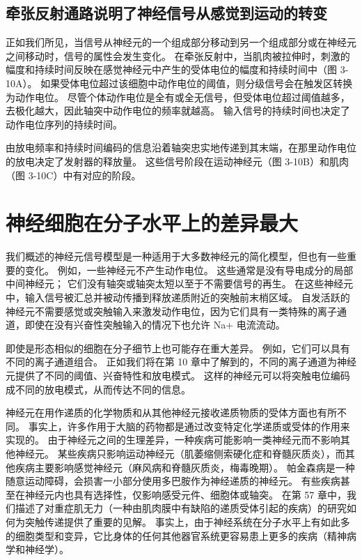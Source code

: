 \subsection{牵张反射通路说明了神经信号从感觉到运动的转变}
正如我们所见，当信号从神经元的一个组成部分移动到另一个组成部分或在神经元之间移动时，信号的属性会发生变化。 在牵张反射中，当肌肉被拉伸时，刺激的幅度和持续时间反映在感觉神经元中产生的受体电位的幅度和持续时间中（图 3-10A）。 如果受体电位超过该细胞中动作电位的阈值，则分级信号会在触发区转换为动作电位。 尽管个体动作电位是全有或全无信号，但受体电位超过阈值越多，去极化越大，因此轴突中动作电位的频率就越高。 输入信号的持续时间也决定了动作电位序列的持续时间。

由放电频率和持续时间编码的信息沿着轴突忠实地传递到其末端，在那里动作电位的放电决定了发射器的释放量。 这些信号阶段在运动神经元（图 3-10B）和肌肉（图 3-10C）中有对应的阶段。


\section{神经细胞在分子水平上的差异最大}
我们概述的神经元信号模型是一种适用于大多数神经元的简化模型，但也有一些重要的变化。 例如，一些神经元不产生动作电位。 这些通常是没有导电成分的局部中间神经元； 它们没有轴突或轴突太短以至于不需要信号的再生。 在这些神经元中，输入信号被汇总并被动传播到释放递质附近的突触前末梢区域。 自发活跃的神经元不需要感觉或突触输入来激发动作电位，因为它们具有一类特殊的离子通道，即使在没有兴奋性突触输入的情况下也允许 Na+ 电流流动。

即使是形态相似的细胞在分子细节上也可能存在重大差异。 例如，它们可以具有不同的离子通道组合。 正如我们将在第 10 章中了解到的，不同的离子通道为神经元提供了不同的阈值、兴奋特性和放电模式。 这样的神经元可以将突触电位编码成不同的放电模式，从而传达不同的信息。

神经元在用作递质的化学物质和从其他神经元接收递质物质的受体方面也有所不同。 事实上，许多作用于大脑的药物都是通过改变特定化学递质或受体的作用来实现的。 由于神经元之间的生理差异，一种疾病可能影响一类神经元而不影响其他神经元。 某些疾病只影响运动神经元（肌萎缩侧索硬化症和脊髓灰质炎），而其他疾病主要影响感觉神经元（麻风病和脊髓灰质炎，梅毒晚期）。 帕金森病是一种随意运动障碍，会损害一小部分使用多巴胺作为神经递质的神经元。 有些疾病甚至在神经元内也具有选择性，仅影响感受元件、细胞体或轴突。 在第 57 章中，我们描述了对重症肌无力（一种由肌肉膜中有缺陷的递质受体引起的疾病）的研究如何为突触传递提供了重要的见解。 事实上，由于神经系统在分子水平上有如此多的细胞类型和变异，它比身体的任何其他器官系统更容易患上更多的疾病（精神病学和神经学）。

